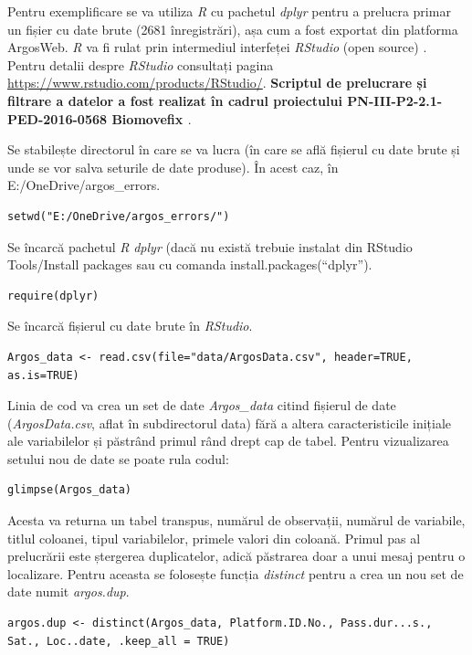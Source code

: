 \documentclass[11pt,onehalfspacing]{elife}
\begin{document}
Pentru exemplificare se va utiliza \textit{R} cu pachetul \textit{dplyr} \citep{Wickham2018} pentru a prelucra primar un fișier cu date brute (2681 înregistrări), așa cum a fost exportat din platforma ArgosWeb. \textit{R} va fi rulat prin intermediul interfeței \textit{RStudio} (open source) \citep{Wickham2016}. Pentru detalii despre \textit{RStudio} consultați pagina \url{https://www.rstudio.com/products/RStudio/}. \textbf{Scriptul de prelucrare și filtrare a datelor a fost realizat în cadrul proiectului PN-III-P2-2.1-PED-2016-0568 Biomovefix \citep{laurentiu_rozylowicz_2018_1321250}}.

Se stabilește directorul în care se va lucra (în care se află fișierul cu date brute și unde se vor salva seturile de date produse). În acest caz, în E:/OneDrive/argos\_errors.
\begin{lstlisting}
setwd("E:/OneDrive/argos_errors/")
\end{lstlisting}

Se încarcă pachetul \textit{R} \textit{dplyr} (dacă nu există trebuie instalat din RStudio Tools/Install packages sau cu comanda install.packages(“dplyr”).
\begin{lstlisting}
require(dplyr)
\end{lstlisting}

Se încarcă fișierul cu date brute în \textit{RStudio}.
\begin{lstlisting}
Argos_data <- read.csv(file="data/ArgosData.csv", header=TRUE, as.is=TRUE)
\end{lstlisting}

Linia de cod va crea un set de date \textit{Argos\_data} citind fișierul de date (\textit{ArgosData.csv}, aflat în subdirectorul data) fără a altera caracteristicile inițiale ale variabilelor și păstrând primul rând drept cap de tabel. Pentru vizualizarea setului nou de date se poate rula codul: 
\begin{lstlisting}
glimpse(Argos_data)
\end{lstlisting}

Acesta va returna un tabel transpus, numărul de observații, numărul de variabile, titlul coloanei, tipul variabilelor, primele valori din coloană.
Primul pas al prelucrării este ștergerea duplicatelor, adică păstrarea doar a unui mesaj pentru o localizare. Pentru aceasta se folosește funcția \textit{distinct} pentru a crea un nou set de date numit \textit{argos.dup}.
\begin{lstlisting}
argos.dup <- distinct(Argos_data, Platform.ID.No., Pass.dur...s., Sat., Loc..date, .keep_all = TRUE)
\end{lstlisting}
\end{document}
